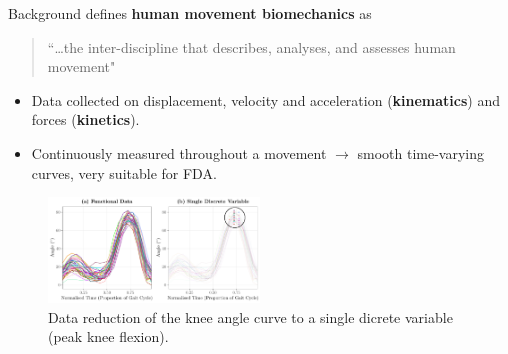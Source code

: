 \documentclass[aspectratio=128,xcolor=dvipsnames, notes]{beamer}
\newcommand{\1}{\mathbf{1}}
\begin{document}
\begin{frame}[noframenumbering]{Background}
\textcite{winter_biomechanics_1979} defines \textbf{human movement biomechanics} as
    \begin{quote}
        ``\dots the inter-discipline that describes, analyses, and assesses human movement" 
    \end{quote}

\begin{itemize}
     \item Data collected on displacement, velocity and acceleration (\textbf{kinematics}) and forces (\textbf{kinetics}).
     \item Continuously measured throughout a movement $\rightarrow$ smooth time-varying curves, very suitable for FDA.
\end{itemize}
\vfill
 \begin{figure}
    \centering
    \includegraphics[width=0.5\textwidth]{figures/discrete-variable-plot.pdf}
    \caption{Data reduction of the knee angle curve to a single dicrete variable (peak knee flexion).}
    \label{fig:enter-label}
\end{figure}
\end{frame}
\end{document}
